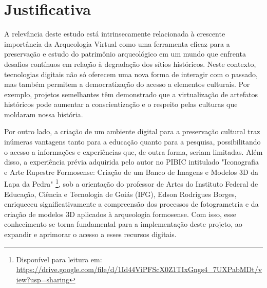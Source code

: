 \section{Justificativa}
A relevância deste estudo está intrinsecamente relacionada à crescente importância da Arqueologia Virtual como uma ferramenta eficaz para a preservação e estudo do patrimônio arqueológico em um mundo que enfrenta desafios contínuos em relação à degradação dos sítios históricos. Neste contexto, tecnologias digitais não só oferecem uma nova forma de interagir com o passado, mas também permitem a democratização do acesso a elementos culturais. Por exemplo, projetos semelhantes têm demonstrado que a virtualização de artefatos históricos pode aumentar a conscientização e o respeito pelas culturas que moldaram nossa história.

Por outro lado, a criação de um ambiente digital para a preservação cultural traz inúmeras vantagens tanto para a educação quanto para a pesquisa, possibilitando o acesso a informações e experiências que, de outra forma, seriam limitadas. Além disso, a experiência prévia adquirida pelo autor no PIBIC intitulado "Iconografia e Arte Rupestre Formosense: Criação de um Banco de Imagens e Modelos 3D da Lapa da Pedra" \footnote{Disponível para leitura em: 
\href{https://drive.google.com/file/d/1Id44ViPFScX0Z1TIxGngs4_7UXPabMDt/view?usp=sharing}{https://drive.google.com/file/d/1Id44ViPFScX0Z1TIxGngs4_7UXPabMDt/view?usp=sharing}}, sob a orientação do professor de Artes do  Instituto Federal de Educação, Ciência e Tecnologia de Goiás (IFG), Edson Rodrigues Borges, enriqueceu significativamente a compreensão dos processos de fotogrametria e da criação de modelos 3D aplicados à arqueologia formosense. Com isso, esse conhecimento se torna fundamental para a implementação deste projeto, ao expandir e aprimorar o acesso a esses recursos digitais.

